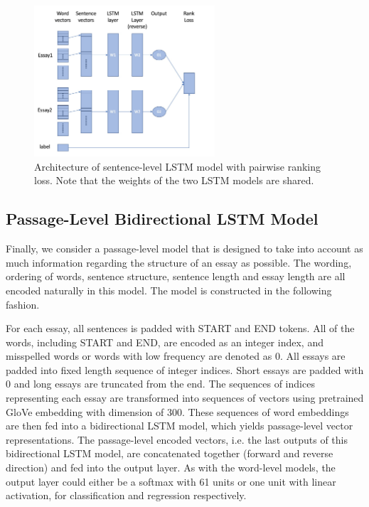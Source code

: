 \documentclass[10pt,psamsfonts]{amsart}
\theoremstyle{definition}
\theoremstyle{remark}
\numberwithin{equation}{section}
\begin{document}
\begin{figure}
	\includegraphics[width=0.6\textwidth]{rankmodel.jpg}
	\caption{Architecture of sentence-level LSTM model with pairwise ranking loss. Note that the weights of the two LSTM models are shared.}
	\label{fig:rankmodel}
\end{figure}

\subsection*{Passage-Level Bidirectional LSTM Model}

Finally, we consider a passage-level model that is designed to take into account as much information regarding the structure of an essay as possible. The wording, ordering of words, sentence structure, sentence length and essay length are all encoded naturally in this model. The model is constructed in the following fashion.

For each essay, all sentences is padded with START and END tokens. All of the words, including START and END, are encoded as an integer index, and misspelled words or words with low frequency are denoted as 0. All essays are padded into fixed length sequence of integer indices. Short essays are padded with 0 and long essays are truncated from the end. The sequences of indices representing each essay are transformed into sequences of vectors using pretrained GloVe embedding with dimension of 300. These sequences of word embeddings are then fed into a bidirectional LSTM model, which yields passage-level vector representations. The passage-level encoded vectors, i.e. the last outputs of this bidirectional LSTM model, are concatenated together (forward and reverse direction) and fed into the output layer. As with the word-level models, the output layer could either be a softmax with 61 units or one unit with linear activation, for classification and regression respectively.
\end{document}
